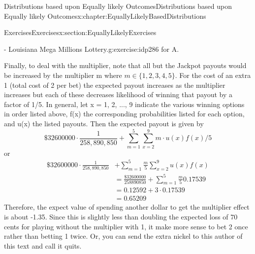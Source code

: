 \documentclass[oneside,10pt,]{book}
\numberwithin{equation}{section}
\begin{document}
\begin{chapterptx}{Distributions based upon Equally likely Outcomes}{}{Distributions based upon Equally likely Outcomes}{}{}{x:chapter:EquallyLikelyBasedDistributions}
\begin{sectionptx}{Exercises}{}{Exercises}{}{}{x:section:EquallyLikelyExercises}
\begin{inlineexercise}{- Louisiana Mega Millions Lottery.}{g:exercise:idp286}
for A.%
\par
Finally, to deal with the multiplier, note that all but the Jackpot payouts would be increased by the multiplier m where \(m \in \{1,2,3,4,5\}\).  For the cost of an extra \textdollar{}1 (total cost of \textdollar{}2 per bet) the expected payout increases as the multiplier increases but each of these decreases likelihood of winning that payout by a factor of 1\slash{}5.  In general, let x = 1, 2, ..., 9 indicate the various winning options in order listed above, f(x) the corresponding probabilities listed for each option, and  u(x) the listed payouts. Then the expected payout is given by%
\begin{equation*}
\$32600000 \cdot \frac{1}{258,890,850} + \sum_{m=1}^5
\sum_{x=2}^9 m \cdot u(x) f(x)/5 
\end{equation*}
or%
\begin{align*}
\$32600000 \cdot \frac{1}{258,890,850} & + \sum_{m=1}^5 \frac{m}{5} \sum_{x=2}^9 u(x) f(x) \\
& = \frac{\$32600000}{258890850} + \sum_{m=1}^5 \frac{m}{5} 0.17539\\
& = 0.12592 + 3 \cdot 0.17539\\
& = 0.65209
\end{align*}
Therefore, the expect value of spending another dollar to get the multiplier effect is about -\textdollar{}1.35.  Since this is slightly less than doubling the expected loss of 70 cents for playing without the multiplier with \textdollar{}1, it make more sense to bet \textdollar{}2 once rather than betting \textdollar{}1 twice.  Or, you can send the extra nickel to this author of this text and call it quits.%
\end{inlineexercise}%
\end{sectionptx}
\end{chapterptx}
%
%
\typeout{************************************************}
\typeout{************************************************}
%
\end{document}

